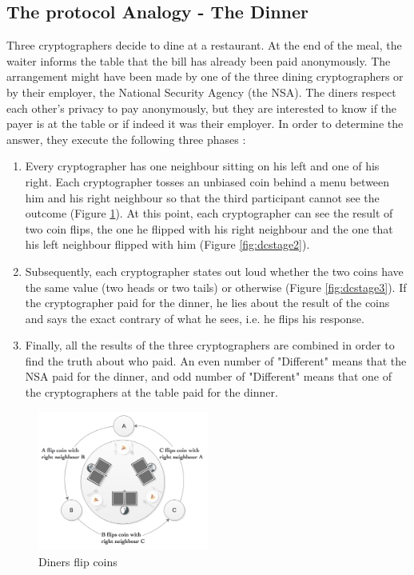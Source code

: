 \subsection{The protocol Analogy - The Dinner}
Three cryptographers decide to dine at a restaurant. At the end of the meal, the waiter informs the table that the bill has already been paid anonymously. The arrangement might have been made by one of the three dining cryptographers or by their employer, the National Security Agency (the NSA). The diners respect each other's privacy to pay anonymously, but they are interested to know if the payer is at the table or if indeed it was their employer. In order to determine the answer, they execute the following three phases \cite{Chaum}:
\begin{enumerate} \label{sec:protocolStages}
    \item Every cryptographer has one neighbour sitting on his left and one of his right. Each cryptographer tosses an unbiased coin behind a menu between him and his right neighbour so that the third participant cannot see the outcome (Figure \ref{fig:dcstage1}). At this point, each cryptographer can see the result of two coin flips, the one he flipped with his right neighbour and the one that his left neighbour flipped with him (Figure \ref{fig:dcstage2}). 
    \item Subsequently, each cryptographer states out loud whether the two coins have the same value (two heads or two tails) or otherwise (Figure \ref{fig:dcstage3}). If the cryptographer paid for the dinner, he lies about the result of the coins and says the exact contrary of what he sees, i.e. he flips his response.
    \item Finally, all the results of the three cryptographers are combined in order to find the truth about who paid. An even number of "Different" means that the NSA paid for the dinner, and odd number of "Different" means that one of the cryptographers at the table paid for the dinner.
\end{enumerate}

\begin{figure}[h!]
    \centering
    \includegraphics[width=0.50\textwidth]{Images/DCstep1.png}
    \caption{Diners flip coins}
    \label{fig:dcstage1}
\end{figure}

